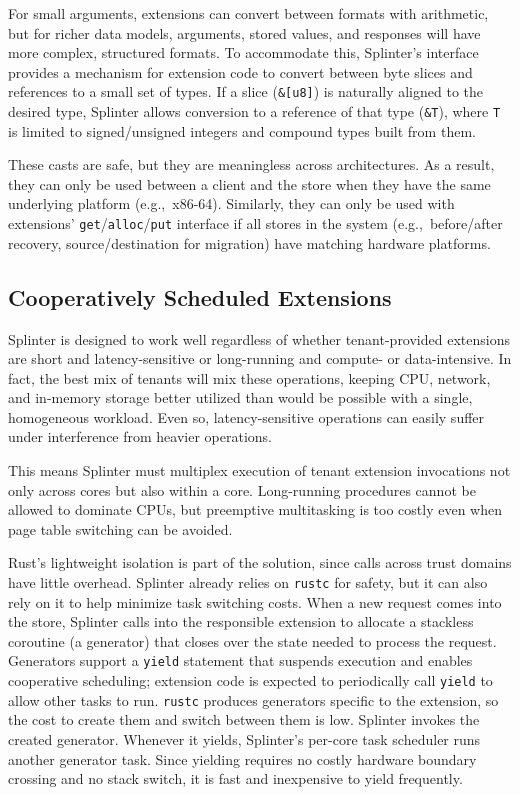 For small arguments, extensions can convert between
  formats with arithmetic, but for richer data models, arguments, stored values, and responses will
  have more complex, structured formats.
To accommodate this, Splinter's interface provides a mechanism for extension
  code to convert between byte slices and references to a small set of types.
If a slice (\texttt{\&[u8]}) is naturally aligned to the desired
  type, Splinter allows conversion to a reference of that type
  (\texttt{\&T}), where \texttt{T} is limited to signed/unsigned
  integers and compound types built from them.

These casts are safe, but they are meaningless across architectures. As a
  result, they can only be used between a client and the store when they have
  the same underlying platform (e.g.,\ x86-64).
Similarly, they can only be used with extensions'
  \texttt{get}/\texttt{alloc}/\texttt{put} interface if all stores in
  the system (e.g.,\  before/after recovery, source/destination for migration) have matching hardware
  platforms.

\subsection{Cooperatively Scheduled Extensions}
\label{sec:coop}

Splinter is designed to work well regardless of whether tenant-provided
  extensions are short and latency-sensitive or long-running and compute- or
  data-intensive.
In fact, the best mix of tenants will mix these operations, keeping CPU,
  network, and in-memory storage better utilized than would be possible with a
  single, homogeneous workload.
Even so, latency-sensitive operations can easily suffer under interference from
  heavier operations.

This means Splinter must multiplex execution of tenant extension invocations
  not only across cores but also within a core.
Long-running procedures cannot be allowed to dominate CPUs, but
  preemptive multitasking is too costly even when page table switching can
  be avoided.

Rust's lightweight isolation is part of the solution, since calls across
  trust domains have little overhead.
Splinter already relies on \texttt{rustc} for safety, but it can also rely on
  it to help minimize task switching costs.
When a new request comes into the store, Splinter calls into the responsible extension
  to allocate a stackless coroutine (a generator) that closes
  over the state needed to process the request.
Generators support a
  \texttt{yield} statement that suspends execution and enables
  cooperative scheduling;
  extension code is expected to periodically call \texttt{yield} to
  allow other tasks to run.
\texttt{rustc} produces generators specific to the extension, so the
  cost to create them and switch between them is low.
Splinter invokes the created generator.
Whenever it yields,
  Splinter's per-core task scheduler runs another generator task.
Since yielding requires no costly hardware boundary crossing and no stack
  switch, it is fast and inexpensive to yield frequently.

